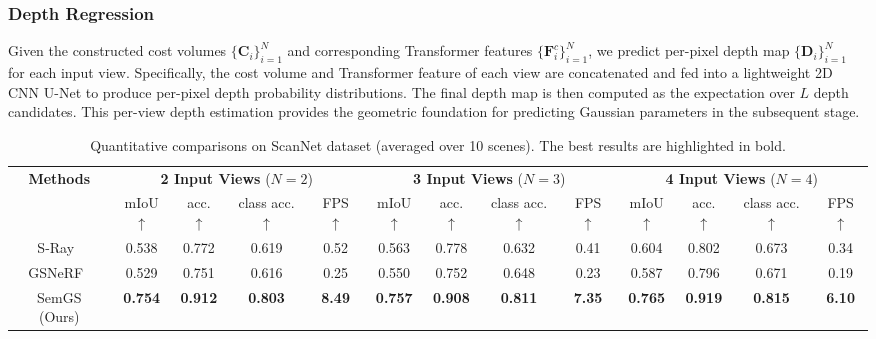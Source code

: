 \documentclass[letterpaper, 10 pt, conference]{ieeeconf}  %
\begin{document}
\subsubsection{Depth Regression}
Given the constructed cost volumes $\{\mathbf{C}_i\}_{i=1}^N$ and corresponding Transformer features $\{\mathbf{F}^c_i\}_{i=1}^N$, we predict per-pixel depth map $\{\mathbf{D}_i\}_{i=1}^N$ for each input view.
Specifically, the cost volume and Transformer feature of each view are concatenated and fed into a lightweight 2D CNN U-Net to produce per-pixel depth probability distributions.
The final depth map is then computed as the expectation over \(L\) depth candidates. This per-view depth estimation provides the geometric foundation for predicting Gaussian parameters in the subsequent stage.

\begin{table}[t]
\centering
\caption{Quantitative comparisons on ScanNet dataset (averaged over 10 scenes). The best results are highlighted in bold.}
\setlength{\tabcolsep}{6pt}
\begin{tabular}{c|cccc|cccc|cccc}
\toprule
\multirow{2.5}{*}{\textbf{Methods}} & \multicolumn{4}{c|}{\textbf{2 Input Views} ($N=2$)} & \multicolumn{4}{c|}{\textbf{3 Input Views} ($N=3$)} & \multicolumn{4}{c}{\textbf{4 Input Views} ($N=4$)} \\
\rule{0pt}{8pt}
& mIoU$\uparrow$ & acc.$\uparrow$ & class acc.$\uparrow$ & FPS$\uparrow$ & mIoU$\uparrow$ & acc.$\uparrow$ & class acc.$\uparrow$ & FPS$\uparrow$ & mIoU$\uparrow$ & acc.$\uparrow$ & class acc.$\uparrow$ & FPS$\uparrow$ \\
\midrule
S-Ray~\cite{S-Ray} & 0.538 & 0.772 & 0.619 & 0.52 & 0.563 & 0.778 & 0.632 & 0.41 & 0.604 & 0.802 & 0.673 & 0.34 \\
\rule{0pt}{7pt}
GSNeRF~\cite{GSNeRF} & 0.529 & 0.751 & 0.616 & 0.25 & 0.550 & 0.752 & 0.648 & 0.23 & 0.587 & 0.796 & 0.671 & 0.19 \\
\rule{0pt}{7pt}
SemGS (Ours) & \textbf{0.754} & \textbf{0.912} & \textbf{0.803} & \textbf{8.49} & \textbf{0.757} & \textbf{0.908} & \textbf{0.811} & \textbf{7.35} & \textbf{0.765} & \textbf{0.919} & \textbf{0.815} & \textbf{6.10} \\
\bottomrule
\end{tabular}
\label{tab:scannet}
\end{table}
\end{document}
